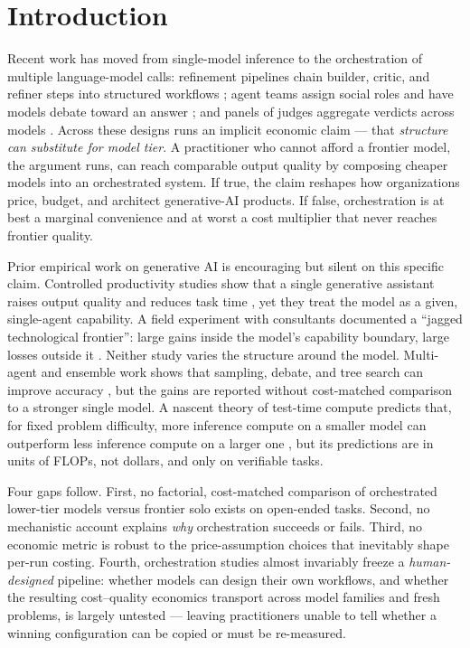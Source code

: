 \documentclass[12pt,a4paper]{article}
\begin{document}
\section{Introduction}\label{sec:intro}
Recent work has moved from single-model inference to the orchestration of
multiple language-model calls: refinement pipelines chain builder, critic, and
refiner steps into structured workflows \citep{WeiEtAl2022, ShinnEtAl2023,
YaoEtAl2023}; agent teams assign social roles and have models debate toward an
answer \citep{LiangEtAl2024}; and panels of judges aggregate verdicts across
models \citep{ZhengEtAl2023, VergaEtAl2024}. Across these designs runs an
implicit economic claim --- that \emph{structure can substitute for model tier}.
A practitioner who cannot afford a frontier model, the argument runs, can reach
comparable output quality by composing cheaper models into an orchestrated
system. If true, the claim reshapes how organizations price, budget, and
architect generative-AI products. If false, orchestration is at best a marginal
convenience and at worst a cost multiplier that never reaches frontier quality.

Prior empirical work on generative AI is encouraging but silent on this
specific claim. Controlled productivity studies show that a single generative
assistant raises output quality and reduces task time \citep{NoyZhang2023,
BrynjolfssonLiRaymond2023}, yet they treat the model as a given, single-agent
capability. A field experiment with consultants documented a ``jagged
technological frontier'': large gains inside the model's capability boundary,
large losses outside it \citep{DellAcquaEtAl2023}. Neither study varies the
structure around the model. Multi-agent and ensemble work shows that sampling,
debate, and tree search can improve accuracy \citep{WangEtAl2023,
LiangEtAl2024, YaoEtAl2023}, but the gains are reported without cost-matched
comparison to a stronger single model. A nascent theory of test-time compute
predicts that, for fixed problem difficulty, more inference compute on a
smaller model can outperform less inference compute on a larger one
\citep{SnellEtAl2024}, but its predictions are in units of FLOPs, not dollars,
and only on verifiable tasks.

Four gaps follow. First, no factorial, cost-matched comparison of orchestrated
lower-tier models versus frontier solo exists on open-ended tasks. Second, no
mechanistic account explains \emph{why} orchestration succeeds or fails. Third, no economic
metric is robust to the price-assumption choices that inevitably shape per-run
costing. Fourth, orchestration studies almost invariably freeze a
\emph{human-designed} pipeline: whether models can design their own workflows,
and whether the resulting cost--quality economics transport across model
families and fresh problems, is largely untested --- leaving practitioners
unable to tell whether a winning configuration can be copied or must be
re-measured.
\end{document}
